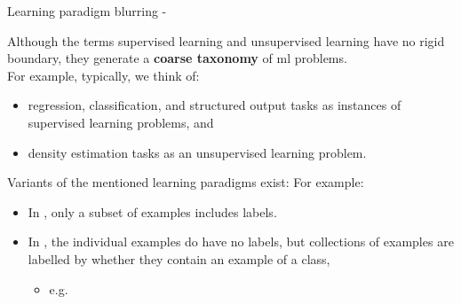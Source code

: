 \begin{frame}[t,allowframebreaks]{
    Learning paradigm blurring - }
    \framebreak


    Although the terms \gls{supervised learning} 
    and \gls{unsupervised learning} 
    have no rigid boundary, 
    they generate a {\bf coarse taxonomy}
    of \gls{ml} problems.\\
    \vspace{0.2cm}
    For example, typically, we think of:
    \begin{itemize}
        \item
        \gls{regression},
        \gls{classification}, and
        \gls{structured output} tasks
        as instances of \gls{supervised learning} problems, and
        \item
        \gls{density estimation} tasks
        as an \gls{unsupervised learning} problem.
    \end{itemize}

    \vspace{0.2cm}

    Variants of the mentioned learning paradigms exist:
    For example:\\
    \begin{itemize}
        \item 
        In ,
        only a subset of examples includes labels.\\
        \item 
        In ,
        the individual examples do have no labels, 
        but collections of examples are labelled by whether they 
        contain an example of a class,\\
        \begin{itemize}
            \small 
            \item e.g.
        \end{itemize}
    \end{itemize}

\end{frame}
